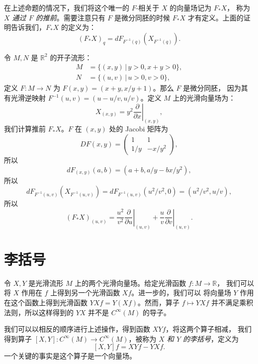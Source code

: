 在上述命题的情况下，我们将这个唯一的 $F$-相关于 $X$ 的向量场记为 $F_*X$，
称为\emph{$X$ 通过 $F$ 的推前}。需要注意只有 $F$ 是微分同胚的时候 $F_*X$
才有定义。上面的证明告诉我们，$F_*X$ 的定义为：
\begin{equation}
  (F_*X)_q=dF_{F^{-1}(q)}\left(X_{F^{-1}(q)}\right).
\end{equation}

\begin{example}[向量场推前的计算]
  令 $M,N$ 是 $\mathbb{R}^2$ 的开子流形：
  \begin{align*}
    M&=\{(x,y)\,|\, y>0,x+y>0\},\\
    N&=\{(u,v)\,|\, u>0,v>0\},
  \end{align*}
  定义 $F:M\to N$ 为 $F(x,y)=(x+y,x/y+1)$。那么 $F$ 是微分同胚，
  因为其有光滑逆映射 $F^{-1}(u,v)=(u-u/v,u/v)$。定义 $M$
  上的光滑向量场为：
  \[
    X_{(x,y)}=y^2\left.\frac{\partial}{\partial x}\right|_{(x,y)}  ,
  \]
  我们计算推前 $F_*X$。$F$ 在 $(x,y)$ 处的 Jacobi 矩阵为
  \[
    DF(x,y)=\begin{pmatrix}
      1 & 1 \\ 
      1/y & -x/y^2
    \end{pmatrix} ,
  \]
  所以
  \[
    dF_{(x,y)}(a,b)=\left(a+b,a/y-bx/y^2\right),  
  \]
  所以
  \[
    dF_{F^{-1}(u,v)}\left(X_{F^{-1}(u,v)}\right)=  
    dF_{F^{-1}(u,v)}(u^2/v^2,0)=
    \left(u^2/v^2,u/v\right),
  \]
  所以
  \[
    (F_*X)_{(u,v)}=\frac{u^2}{v^2}\left.\frac{\partial}{\partial u}\right|_{(u,v )}  
    +\frac{u}{v}\left.\frac{\partial}{\partial v}\right|_{(u,v)} .
  \]
\end{example}

\section{李括号}

令 $X,Y$ 是光滑流形 $M$ 上的两个光滑向量场。给定光滑函数 $f:M\to \mathbb{R}$，
我们可以将 $X$ 作用在 $f$ 上得到另一个光滑函数 $Xf$。进一步的，我们可以
将向量场 $Y$ 作用在这个函数上得到光滑函数 $YXf=Y(Xf)$。然而，算子 $f\mapsto YXf$
并不满足乘积法则，所以这样得到的 $YX$ 并不是 $C^\infty(M)$ 的导子。

我们可以以相反的顺序进行上述操作，得到函数 $XYf$，将这两个算子相减，
我们得到算子 $[X,Y]:C^\infty(M)\to C^\infty(M)$，被称为
\emph{$X$ 和 $Y$ 的李括号}，定义为
\[
  [X,Y]f=XYf-YXf.  
\]
一个关键的事实是这个算子是一个向量场。

